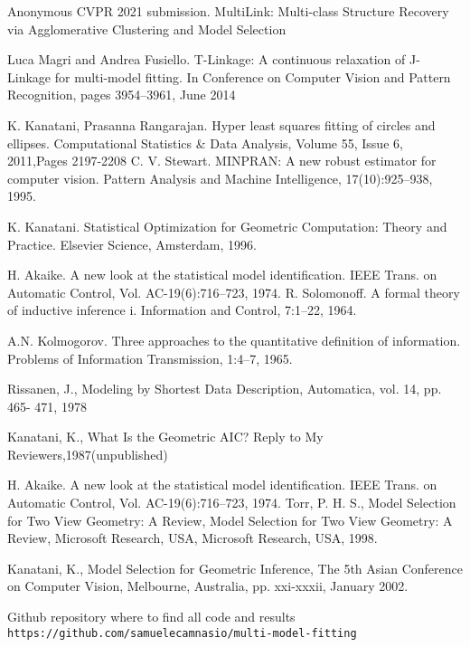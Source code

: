 \documentclass[12pt]{article}
\begin{document}
\begin{thebibliography}{}

 Anonymous CVPR 2021 submission. MultiLink: Multi-class Structure Recovery via Agglomerative Clustering and Model Selection

Luca Magri and Andrea Fusiello. T-Linkage: A continuous relaxation of J-Linkage for multi-model fitting. In Conference on Computer Vision and Pattern Recognition, pages 3954–3961, June 2014

K. Kanatani, Prasanna Rangarajan. Hyper least squares fitting of circles and ellipses. Computational Statistics \& Data Analysis, Volume 55, Issue 6, 2011,Pages 2197-2208
C. V. Stewart. MINPRAN: A new robust estimator for computer vision. Pattern Analysis and Machine Intelligence, 17(10):925–938, 1995.

 K. Kanatani. Statistical Optimization for Geometric Computation: Theory and Practice. Elsevier Science, Amsterdam, 1996.

H. Akaike. A new look at the statistical model identification. IEEE Trans. on Automatic Control, Vol. AC-19(6):716–723, 1974.
 R. Solomonoff. A formal theory of inductive inference i. Information and Control, 7:1–22, 1964.

A.N. Kolmogorov. Three approaches to the quantitative definition of information. Problems of Information Transmission, 1:4–7, 1965.

Rissanen, J., Modeling by Shortest Data Description, Automatica, vol. 14, pp. 465- 471, 1978

Kanatani, K., What Is the Geometric AIC? Reply to My Reviewers,1987(unpublished)

 H. Akaike. A new look at the statistical model identification. IEEE Trans. on Automatic Control, Vol. AC-19(6):716–723, 1974.
Torr, P. H. S., Model Selection for Two View Geometry: A Review, Model Selection for Two View Geometry: A Review, Microsoft Research, USA, Microsoft Research, USA, 1998.

 Kanatani, K., Model Selection for Geometric Inference, The 5th Asian Conference on Computer Vision, Melbourne, Australia, pp. xxi-xxxii, January 2002.

Github repository where to find all code and results\\\texttt{https://github.com/samuelecamnasio/multi-model-fitting}

\end{thebibliography}
\end{document}
